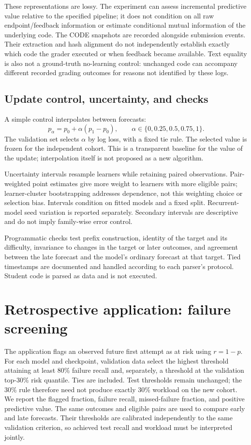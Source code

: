 \documentclass[11pt]{article}
\newcommand{\1}{\mathbb{I}}
\begin{document}
These representations are lossy. The experiment can assess incremental predictive value relative to the specified pipeline; it does not condition on all raw endpoint/feedback information or estimate conditional mutual information of the underlying code. The CODE snapshots are recorded alongside submission events. Their extraction and hash alignment do not independently establish exactly which code the grader executed or when feedback became available. Text equality is also not a ground-truth no-learning control: unchanged code can accompany different recorded grading outcomes for reasons not identified by these logs.

\subsection{Update control, uncertainty, and checks}
A simple control interpolates between forecasts:
\begin{equation}
 p_{\alpha}=p_0+\alpha(p_1-p_0),\qquad
 \alpha\in\{0,0.25,0.5,0.75,1\}.
\end{equation}
The validation set selects $\alpha$ by log loss, with a fixed tie rule. The selected value is frozen for the independent cohort. This is a transparent baseline for the value of the update; interpolation itself is not proposed as a new algorithm.

Uncertainty intervals resample learners while retaining paired observations. Pair-weighted point estimates give more weight to learners with more eligible pairs; learner-cluster bootstrapping addresses dependence, not this weighting choice or selection bias. Intervals condition on fitted models and a fixed split. Recurrent-model seed variation is reported separately. Secondary intervals are descriptive and do not imply family-wise error control.

Programmatic checks test prefix construction, identity of the target and its difficulty, invariance to changes in the target or later outcomes, and agreement between the late forecast and the model's ordinary forecast at that target. Tied timestamps are documented and handled according to each parser's protocol. Student code is parsed as data and is not executed.

\section{Retrospective application: failure screening}
The application flags an observed future first attempt as at risk using $r=1-p$. For each model and checkpoint, validation data select the highest threshold attaining at least 80\% failure recall and, separately, a threshold at the validation top-30\% risk quantile. Ties are included. Test thresholds remain unchanged; the 30\% rule therefore need not produce exactly 30\% workload on the new cohort. We report the flagged fraction, failure recall, missed-failure fraction, and positive predictive value. The same outcomes and eligible pairs are used to compare early and late forecasts. Their thresholds are calibrated independently to the same validation criterion, so achieved test recall and workload must be interpreted jointly.
\end{document}
